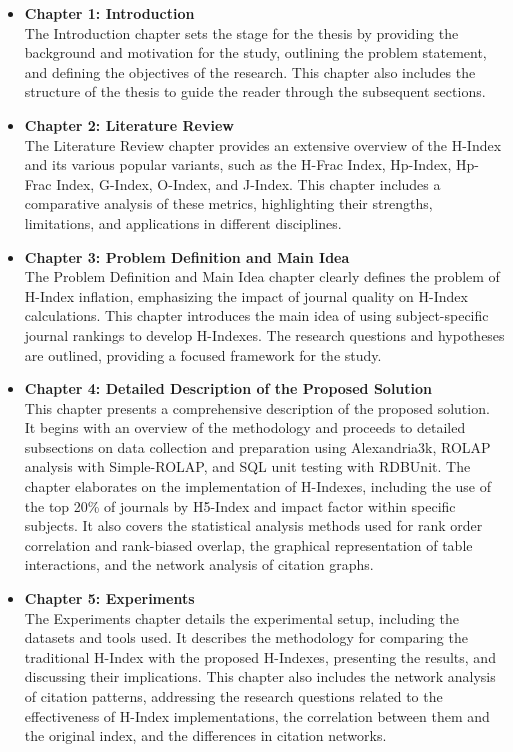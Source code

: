 \begin{itemize}
    \item \textbf{Chapter 1: Introduction} \\
          The Introduction chapter sets the stage for the thesis by providing the background and motivation for the study, outlining the problem statement, and defining the objectives of the research. This chapter also includes the structure of the thesis to guide the reader through the subsequent sections.

    \item \textbf{Chapter 2: Literature Review} \\
          The Literature Review chapter provides an extensive overview of the H-Index and its various popular variants, such as the H-Frac Index, Hp-Index, Hp-Frac Index, G-Index, O-Index, and J-Index. This chapter includes a comparative analysis of these metrics, highlighting their strengths, limitations, and applications in different disciplines.

    \item \textbf{Chapter 3: Problem Definition and Main Idea} \\
          The Problem Definition and Main Idea chapter clearly defines the problem of H-Index inflation, emphasizing the impact of journal quality on H-Index calculations. This chapter introduces the main idea of using subject-specific journal rankings to develop H-Indexes. The research questions and hypotheses are outlined, providing a focused framework for the study.

    \item \textbf{Chapter 4: Detailed Description of the Proposed Solution} \\
          This chapter presents a comprehensive description of the proposed solution.
          It begins with an overview of the methodology and proceeds to detailed subsections
          on data collection and preparation using Alexandria3k, ROLAP analysis with Simple-ROLAP,
          and SQL unit testing with RDBUnit. The chapter elaborates on the implementation of H-Indexes,
          including the use of the top 20\% of journals by H5-Index and impact factor within specific subjects.
          It also covers the statistical analysis methods used for rank order correlation and rank-biased overlap,
          the graphical representation of table interactions, and the network analysis of citation graphs.

    \item \textbf{Chapter 5: Experiments} \\
          The Experiments chapter details the experimental setup,
          including the datasets and tools used. It describes the methodology for comparing the traditional H-Index with the proposed H-Indexes,
          presenting the results, and discussing their implications. This chapter also includes the network analysis of citation patterns,
          addressing the research questions related to the effectiveness of H-Index implementations, the correlation between them and the
          original index, and the differences in citation networks.


\end{itemize}
